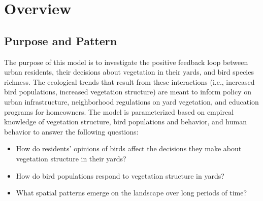 \documentclass{article}
\begin{document}
\section{Overview}
\subsection{Purpose and Pattern}

The purpose of this model is to investigate the positive feedback loop between urban residents, their
decisions about vegetation in their yards, and bird species richness. The ecological trends that
result from these interactions (i.e., increased bird populations, increased vegetation structure)
are meant to inform policy on urban infrastructure, neighborhood regulations on yard vegetation,
and education programs for homeowners. The model is parameterized based on empircal
knowledge of vegetation structure, bird populations and behavior, and human behavior
to answer the following questions:
\begin{itemize}
    \item How do residents' opinions of birds affect the decisions they make about 
    vegetation structure in their yards?
    \item How do bird populations respond to vegetation structure in yards?
    \item What spatial patterns emerge on the landscape over long periods of time?
\end{itemize}
\end{document}
